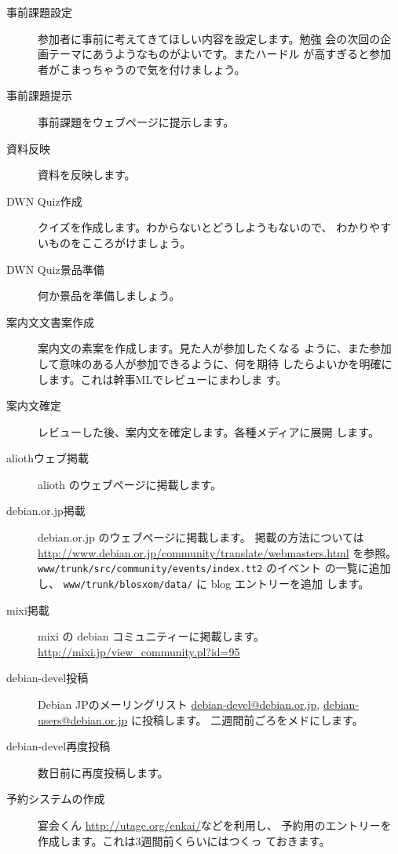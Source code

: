 \documentclass[mingoth,a4paper]{jsarticle}
\begin{document}
\begin{description}
\item[事前課題設定] 参加者に事前に考えてきてほしい内容を設定します。勉強
	   会の次回の企画テーマにあうようなものがよいです。またハードル
	   が高すぎると参加者がこまっちゃうので気を付けましょう。
\item[事前課題提示] 事前課題をウェブページに提示します。
\item[資料反映] 資料を反映します。
\item[DWN Quiz作成] クイズを作成します。わからないとどうしようもないので、
	   わかりやすいものをこころがけましょう。
\item[DWN Quiz景品準備] 何か景品を準備しましょう。
\item[案内文文書案作成] 案内文の素案を作成します。見た人が参加したくなる
	   ように、また参加して意味のある人が参加できるように、何を期待
	   したらよいかを明確にします。これは幹事MLでレビューにまわしま
	   す。
\item[案内文確定] レビューした後、案内文を確定します。各種メディアに展開
	   します。
\item[aliothウェブ掲載] alioth のウェブページに掲載します。
\item[debian.or.jp掲載] debian.or.jp のウェブページに掲載します。
	   掲載の方法については
	   \url{http://www.debian.or.jp/community/translate/webmasters.html}
	   を参照。
	   \texttt{www/trunk/src/community/events/index.tt2} のイベント
	   の一覧に追加し、 \texttt{www/trunk/blosxom/data/} に blog エントリーを追加
	   します。
\item[mixi掲載]  mixi の debian コミュニティーに掲載します。\url{http://mixi.jp/view_community.pl?id=95}
\item[debian-devel投稿]
	   Debian JPのメーリングリスト \url{debian-devel@debian.or.jp},
	   \url{debian-users@debian.or.jp} に投稿します。
	   二週間前ごろをメドにします。
\item[debian-devel再度投稿]
	   数日前に再度投稿します。
\item[予約システムの作成]
	   宴会くん \url{http://utage.org/enkai/}などを利用し、
	   予約用のエントリーを作成します。これは3週間前くらいにはつくっ
	   ておきます。
	   

\end{description}
\end{document}
